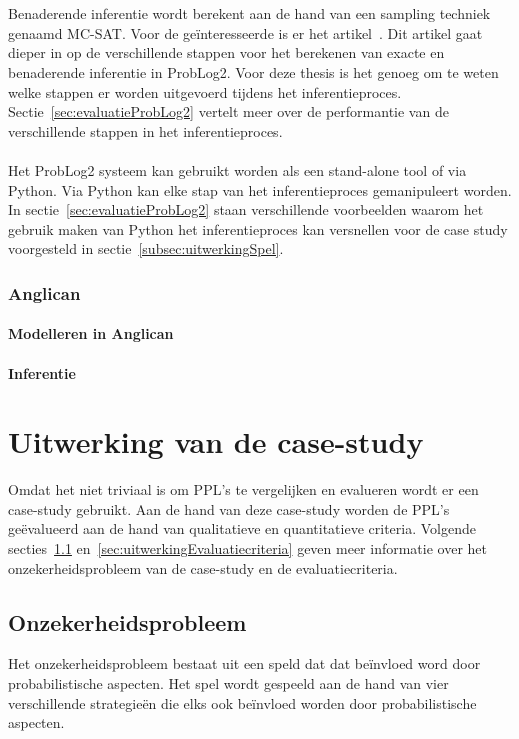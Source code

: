 \documentclass[12pt,a4paper,oneside]{book}
\theoremstyle{definition}
\begin{document}
\\\\
Benaderende inferentie wordt berekent aan de hand van een sampling techniek genaamd MC-SAT. Voor de ge\"{i}nteresseerde is er het artikel~\cite{plpinferencelearningwbf}. Dit artikel gaat dieper in op de verschillende stappen voor het berekenen van exacte en benaderende inferentie in ProbLog2. Voor deze thesis is het genoeg om te weten welke stappen er worden uitgevoerd tijdens het inferentieproces. Sectie~\ref{sec:evaluatieProbLog2} vertelt meer over de performantie van de verschillende stappen in het inferentieproces.
\\\\
Het ProbLog2 systeem kan gebruikt worden als een stand-alone tool of via Python. Via Python kan elke stap van het inferentieproces gemanipuleert worden. In sectie~\ref{sec:evaluatieProbLog2} staan verschillende voorbeelden waarom het gebruik maken van Python het inferentieproces kan versnellen voor de case study voorgesteld in sectie~\ref{subsec:uitwerkingSpel}.
\subsection{Anglican}
\label{sec:Anglican}
\subsubsection{Modelleren in Anglican}
\label{subsubsec:ModellerenInAnglican}
\subsubsection{Inferentie}
\label{subsubsec:InferentieAnglican}


\chapter{Uitwerking van de case-study}
Omdat het niet triviaal is om PPL's te vergelijken en evalueren wordt er een case-study gebruikt. Aan de hand van deze case-study worden de PPL's ge\"{e}valueerd aan de hand van qualitatieve en quantitatieve criteria. Volgende secties~\ref{sec:uitwerkingProblem} en~\ref{sec:uitwerkingEvaluatiecriteria} geven meer informatie over het onzekerheidsprobleem van de case-study en de evaluatiecriteria.
\section{Onzekerheidsprobleem}
\label{sec:uitwerkingProblem}
Het onzekerheidsprobleem bestaat uit een speld dat dat be\"{i}nvloed word door probabilistische aspecten. Het spel wordt gespeeld aan de hand van vier verschillende strategie\"{e}n die elks ook be\"{i}nvloed worden door probabilistische aspecten.
\end{document}
